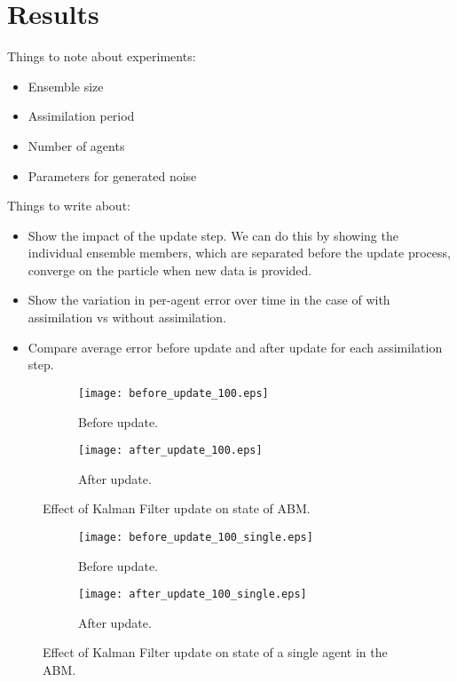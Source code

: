 \chapter{Results}\label{ch:results}

Things to note about experiments:
\begin{itemize}
    \item Ensemble size
    \item Assimilation period
    \item Number of agents
    \item Parameters for generated noise
\end{itemize}

Things to write about:
\begin{itemize}
    \item Show the impact of the update step. We can do this by showing the
        individual ensemble members, which are separated before the update
        process, converge on the particle when new data is provided.
    \item Show the variation in per-agent error over time in the case of with
        assimilation vs without assimilation.
    \item Compare average error before update and after update for each
        assimilation step.
\end{itemize}

\begin{figure}[h]
    \centering
    \begin{subfigure}[h]{\textwidth}
        \texttt{[image: before\_update\_100.eps]}
        \caption{Before update.}\label{fig:abm_before}
    \end{subfigure}

    \begin{subfigure}[h]{\textwidth}
        \texttt{[image: after\_update\_100.eps]}
        \caption{After update.}\label{fig:abm_after}
    \end{subfigure}
    \caption{Effect of Kalman Filter update on state of ABM.}\label{fig:enkf_abm}
\end{figure}

\begin{figure}[h]
    \centering
    \begin{subfigure}[h]{\textwidth}
        \texttt{[image: before\_update\_100\_single.eps]}
        \caption{Before update.}\label{fig:abm_before}
    \end{subfigure}

    \begin{subfigure}[h]{\textwidth}
        \texttt{[image: after\_update\_100\_single.eps]}
        \caption{After update.}\label{fig:abm_after}
    \end{subfigure}
    \caption{Effect of Kalman Filter update on state of a single agent in the
    ABM.}\label{fig:enkf_abmsingle}
\end{figure}

